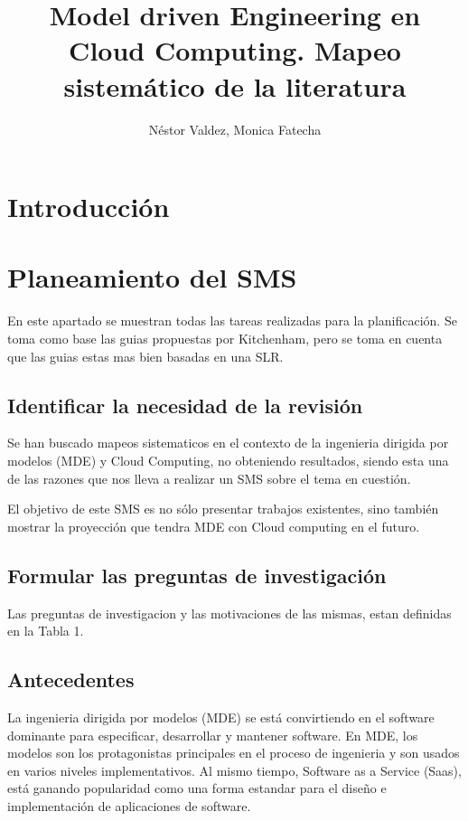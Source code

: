\documentclass{llncs}
\begin{document}
\title{Model driven Engineering en Cloud Computing. Mapeo sistemático de la literatura}

\author{Néstor Valdez, Monica Fatecha}
\maketitle


\section{Introducción}\label{sec:Introduction}
\section{Planeamiento del SMS}\label{sec:Planning}
En este apartado se muestran todas las tareas realizadas para la planificación. Se toma como base las guias propuestas por
Kitchenham\cite{slr}, pero se toma en cuenta que las guias estas mas bien basadas en una SLR.
\subsection{Identificar la necesidad de la revisión}
Se han buscado mapeos sistematicos en el contexto de la ingenieria dirigida por modelos (MDE) y Cloud Computing, no obteniendo
resultados, siendo esta una de las razones que nos lleva a realizar un SMS sobre el tema en cuestión.

El objetivo de este SMS es no sólo presentar trabajos existentes, sino también mostrar la proyección que tendra MDE con Cloud computing
en el futuro.
\subsection{Formular las preguntas de investigación}
Las preguntas de investigacion y las motivaciones de las mismas, estan definidas en la Tabla 1.

\subsection{Antecedentes}
La ingenieria dirigida por modelos (MDE) se está convirtiendo en el software dominante para especificar,
desarrollar y mantener software. En MDE, los modelos son los protagonistas principales en el proceso
de ingenieria y son usados en varios niveles implementativos.
Al mismo tiempo, Software as a Service (Saas), está ganando popularidad como una forma estandar para el diseño
e implementación de aplicaciones de software.
\end{document}
